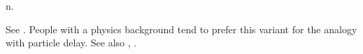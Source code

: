 n.

See . People with a physics background tend to prefer this
variant for the analogy with particle delay. See also ,
.

